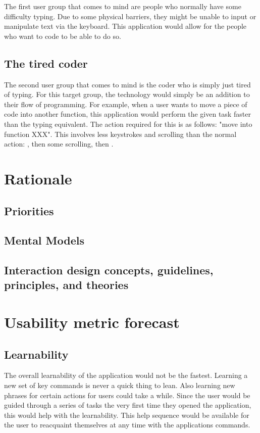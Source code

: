 \documentclass[11pt, oneside]{article}
\begin{document}
The first user group that comes to mind are people who normally have some difficulty typing. Due to some physical barriers, they might be unable to input or manipulate text via the keyboard. This application would allow for the people who want to code to be able to do so. 

\subsection{The tired coder}

The second user group that comes to mind is the coder who is simply just tired of typing. For this target group, the technology would simply be an addition to their flow of programming. For example, when a user wants to move a piece of code into another function, this application would perform the given task faster than the typing equivalent. The action required for this is as follows:  "move into function XXX". This involves less keystrokes and scrolling than the normal action: , then some scrolling, then .




\section{Rationale}

\subsection{Priorities}
\subsection{Mental Models}
\subsection{Interaction design concepts, guidelines, principles, and theories}




\section{Usability metric forecast}

\subsection{Learnability}
The overall learnability of the application would not be the fastest. Learning a new set of key commands is never a quick thing to lean. Also learning new phrases for certain actions for users could take a while. Since the user would be guided through a series of tasks the very first time they opened the application, this would help with the learnability. This help sequence would be available for the user to reacquaint themselves at any time with the applications commands.
\end{document}
